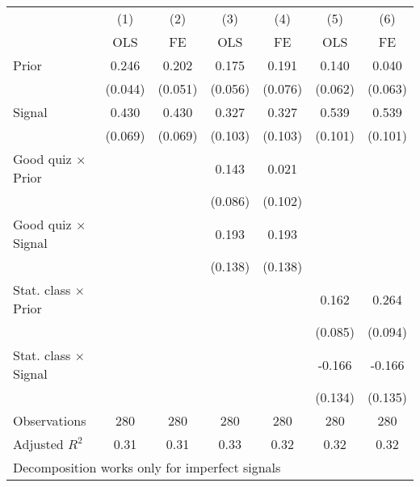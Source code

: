 \begin{tabular}{l*{6}{c}}
\hline\hline
                &\multicolumn{1}{c}{(1)}&\multicolumn{1}{c}{(2)}&\multicolumn{1}{c}{(3)}&\multicolumn{1}{c}{(4)}&\multicolumn{1}{c}{(5)}&\multicolumn{1}{c}{(6)}\\
                &\multicolumn{1}{c}{OLS}&\multicolumn{1}{c}{FE}&\multicolumn{1}{c}{OLS}&\multicolumn{1}{c}{FE}&\multicolumn{1}{c}{OLS}&\multicolumn{1}{c}{FE}\\
\hline
Prior           &    0.246&    0.202&    0.175&    0.191&    0.140&    0.040\\
                &  (0.044)&  (0.051)&  (0.056)&  (0.076)&  (0.062)&  (0.063)\\
Signal          &    0.430&    0.430&    0.327&    0.327&    0.539&    0.539\\
                &  (0.069)&  (0.069)&  (0.103)&  (0.103)&  (0.101)&  (0.101)\\
Good quiz $\times$ Prior&         &         &    0.143&    0.021&         &         \\
                &         &         &  (0.086)&  (0.102)&         &         \\
Good quiz $\times$ Signal&         &         &    0.193&    0.193&         &         \\
                &         &         &  (0.138)&  (0.138)&         &         \\
Stat. class $\times$ Prior&         &         &         &         &    0.162&    0.264\\
                &         &         &         &         &  (0.085)&  (0.094)\\
Stat. class $\times$ Signal&         &         &         &         &   -0.166&   -0.166\\
                &         &         &         &         &  (0.134)&  (0.135)\\
\hline
Observations    &      280&      280&      280&      280&      280&      280\\
Adjusted \(R^{2}\)&     0.31&     0.31&     0.33&     0.32&     0.32&     0.32\\
\hline\hline
\multicolumn{7}{l}{\footnotesize Decomposition works only for imperfect signals}\\
\end{tabular}

